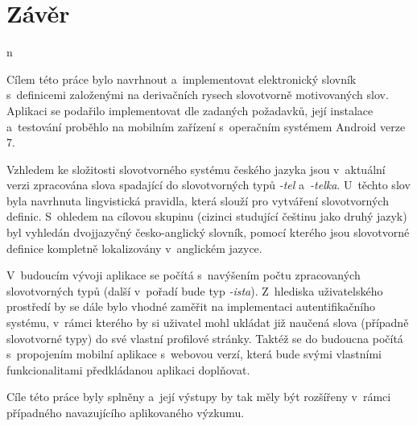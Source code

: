 \hypertarget{zuxe1vux11br}{%
\chapter*{Závěr}\label{zaver}n}

Cílem této práce bylo navrhnout a~implementovat elektronický slovník
s~definicemi založenými na derivačních rysech slovotvorně motivovaných
slov. Aplikaci se podařilo implementovat dle zadaných požadavků, její
instalace a~testování proběhlo na mobilním zařízení s~operačním systémem
Android verze 7.

Vzhledem ke složitosti slovotvorného systému českého jazyka jsou
v~aktuální verzi zpracována slova spadající do slovotvorných typů
\emph{-tel} a~\emph{-telka}. U~těchto slov byla navrhnuta lingvistická
pravidla, která slouží pro vytváření slovotvorných definic. S~ohledem na
cílovou skupinu (cizinci studující češtinu jako druhý jazyk) byl
vyhledán dvojjazyčný česko-anglický slovník, pomocí kterého jsou
slovotvorné definice kompletně lokalizovány v~anglickém jazyce.

V~budoucím vývoji aplikace se počítá s~navýšením počtu zpracovaných
slovotvorných typů (další v~pořadí bude typ \emph{-ista}). Z~hlediska
uživatelského prostředí by se dále bylo vhodné zaměřit na implementaci
autentifikačního systému, v~rámci kterého by si uživatel mohl ukládat
již naučená slova (případně slovotvorné typy) do své vlastní profilové
stránky. Taktéž se do budoucna počítá s~propojením mobilní aplikace
s~webovou verzí, která bude svými vlastními funkcionalitami předkládanou
aplikaci doplňovat.

Cíle této práce byly splněny a~její výstupy by tak měly být rozšířeny
v~rámci případného navazujícího aplikovaného výzkumu.
